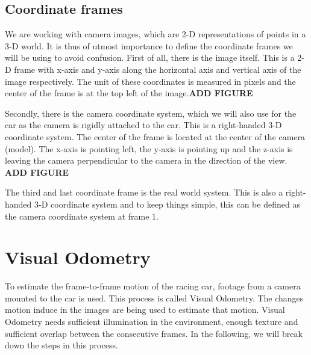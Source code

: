 \subsection{Coordinate frames}
We are working with camera images, which are 2-D representations of points in a 3-D world. It is thus of utmost importance to define the coordinate frames we will be using to avoid confusion. First of all, there is the image itself. This is a 2-D frame with x-axis and y-axis along the horizontal axis and vertical axis of the image respectively. The unit of these coordinates is measured in pixels and the center of the frame is at the top left of the image.\textbf{ADD FIGURE}\bigskip

Secondly, there is the camera coordinate system, which we will also use for the car as the camera is rigidly attached to the car. This is a right-handed 3-D coordinate system. The center of the frame is located at the center of the camera (model). The x-axis is pointing left, the y-axis is pointing up and the z-axis is leaving the camera perpendicular to the camera in the direction of the view. \textbf{ADD FIGURE}\bigskip

The third and last coordinate frame is the real world system. This is also a right-handed 3-D coordinate system and to keep things simple, this can be defined as the camera coordinate system at frame 1.

\section{Visual Odometry}
To estimate the frame-to-frame motion of the racing car, footage from a camera mounted to the car is used. This process is called Visual Odometry. The changes motion induce in the images are being used to estimate that motion. Visual Odometry needs sufficient illumination in the environment, enough texture and sufficient overlap between the consecutive frames. In the following, we will break down the steps in this process.


